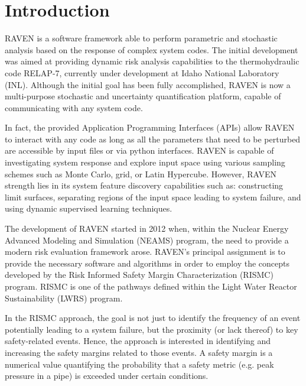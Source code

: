 \section{Introduction}

RAVEN is a software framework able to perform parametric and stochastic
analysis based on the response of complex system codes.
%
The initial development was aimed at providing dynamic risk analysis
capabilities to the thermohydraulic code RELAP-7, currently under development
at Idaho National Laboratory (INL).
%
Although the initial goal has been fully accomplished, RAVEN is now a
multi-purpose stochastic and uncertainty quantification platform, capable of communicating with any system code.

In fact, the provided Application Programming
Interfaces (APIs) allow RAVEN to interact with any code as long as all the parameters
that need to be perturbed are accessible by input files or via python
interfaces.
%
RAVEN is capable of investigating system response and explore input space using various
sampling schemes such as Monte Carlo, grid, or Latin Hypercube.
%
However, RAVEN strength lies in its system feature discovery capabilities such as: constructing
limit surfaces, separating regions of the input space leading to system failure,
and using dynamic supervised learning techniques.

The development of RAVEN started in 2012 when, within the Nuclear Energy
Advanced Modeling and Simulation (NEAMS) program, the need to provide a modern
risk evaluation framework arose.
%
RAVEN's principal assignment is to provide the necessary software and algorithms
in order to employ the concepts developed by the Risk Informed Safety Margin
Characterization (RISMC) program.
%
RISMC is one of the pathways defined within the Light Water Reactor
Sustainability (LWRS) program.

In the RISMC approach, the goal is not just to identify the frequency of an
event potentially leading to a system failure, but the proximity (or lack
thereof) to key safety-related events.
%
Hence, the approach is interested in identifying and increasing the safety
margins related to those events.
%
A safety margin is a numerical value quantifying the probability that a safety
metric (e.g. peak pressure in a pipe) is exceeded under certain conditions.


